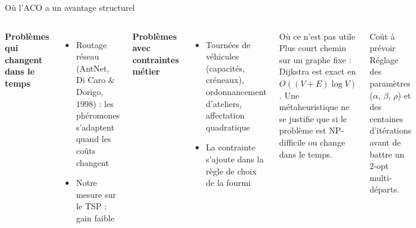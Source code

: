 \documentclass[aspectratio=169,11pt]{beamer}
\begin{document}
\begin{frame}{Où l'ACO a un avantage structurel}
  \begin{columns}[T]
    \small
    \textbf{Problèmes qui changent dans le temps}
    \begin{itemize}
      \item Routage réseau (AntNet, Di Caro \& Dorigo, 1998) : les phéromones s'adaptent quand les
            coûts changent
      \item Notre mesure sur le TSP : gain faible
    \end{itemize}
    \textbf{Problèmes avec contraintes métier}
    \begin{itemize}
      \item Tournées de véhicules (capacités, créneaux), ordonnancement d'ateliers, affectation
            quadratique
      \item La contrainte s'ajoute dans la règle de choix de la fourmi
    \end{itemize}
    \begin{alertblock}{Où ce n'est pas utile}
      Plus court chemin sur un graphe fixe : Dijkstra est exact en
      $O((V+E)\log V)$. Une métaheuristique ne se justifie que si le problème est
      NP-difficile ou change dans le temps.
    \end{alertblock}
    \begin{block}{Coût à prévoir}
      Réglage des paramètres ($\alpha$, $\beta$, $\rho$) et des centaines d'itérations
      avant de battre un 2-opt multi-départs.
    \end{block}
  \end{columns}
\end{frame}
\end{document}
